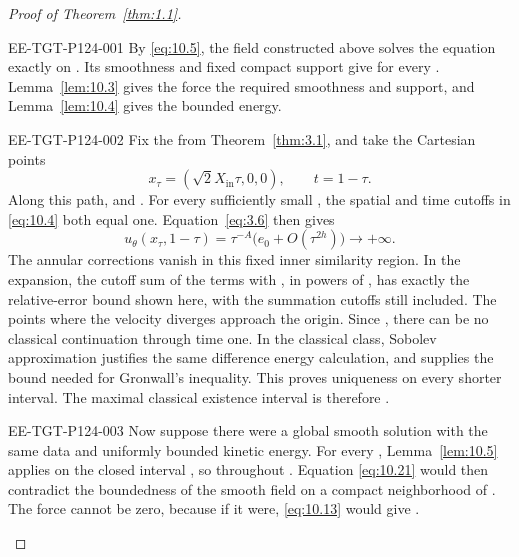 %
\begin{proof}[Proof of Theorem~\ref{thm:1.1}]
\begin{EESegment}{EE-TGT-P124-001}
By \eqref{eq:10.5}, the field constructed above solves the equation exactly on
\NSi{NS-F-P124-001}{[0,1)}. Its smoothness and fixed compact support give
 for every
. Lemma~\ref{lem:10.3} gives the force the required smoothness
and support, and Lemma~\ref{lem:10.4} gives the bounded energy.
\end{EESegment}

\begin{EESegment}{EE-TGT-P124-002}
Fix the  from Theorem~\ref{thm:3.1}, and take the
Cartesian points
\begin{equation}
  x_\tau=(\sqrt2X_{\mathrm{in}}\tau,0,0),\qquad t=1-\tau.
\tag{10.20}\label{eq:10.20}
\end{equation}
Along this path,  and . For every
sufficiently small , the spatial and time cutoffs in
\eqref{eq:10.4} both equal one. Equation~\eqref{eq:3.6} then gives
\begin{equation}
  u_\theta(x_\tau,1-\tau)
  =\tau^{-A}\bigl(e_0+O(\tau^{2h})\bigr)\longrightarrow+\infty.
\tag{10.21}\label{eq:10.21}
\end{equation}
The annular corrections vanish in this fixed inner similarity region. In the expansion, the
cutoff sum of the terms with , in powers of
, has exactly the relative-error bound shown here, with the
summation cutoffs still included. The points  where the
velocity diverges approach the origin. Since
, there can be no
classical  continuation through time one. In the classical
 class, Sobolev approximation justifies the same difference
energy calculation, and  supplies
the bound needed for Gronwall's inequality. This proves uniqueness on every shorter
interval. The maximal classical existence interval is therefore
\NSi{NS-F-P124-017}{[0,1)}.
\end{EESegment}

\begin{EESegment}{EE-TGT-P124-003}
Now suppose there were a global smooth solution  with the same
data and uniformly bounded kinetic energy. For every ,
Lemma~\ref{lem:10.5} applies on the closed interval
, so
 throughout \NSi{NS-F-P124-022}{[0,1)}. Equation
\eqref{eq:10.21} would then contradict the boundedness of the smooth field
 on a compact neighborhood of
. The force cannot be zero, because if it were,
\eqref{eq:10.13} would give .
\end{EESegment}


\end{proof}
